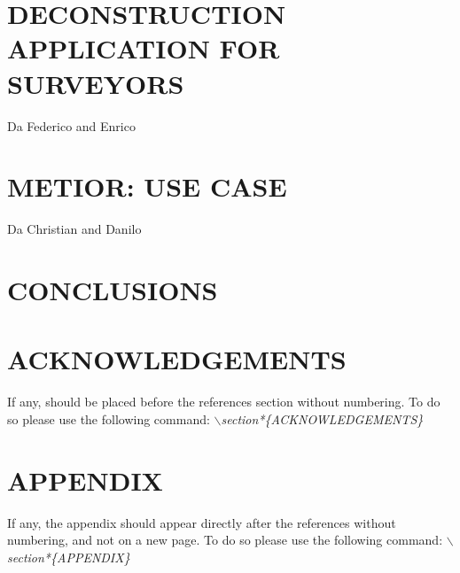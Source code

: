 \documentclass[a4paper,twoside]{article}
\begin{document}
\noindent\lipsum[2-4]


\section{\uppercase{Deconstruction Application for surveyors}}
\label{sec:introduction}

\noindent Da Federico and Enrico

\noindent\lipsum[2-4]


\section{\uppercase{Metior: use case}}
\label{sec:introduction}


\noindent Da Christian and Danilo

\noindent\lipsum[2-4]


\section{\uppercase{Conclusions}}
\label{sec:conclusion}

\noindent\lipsum[2-4]

\section*{\uppercase{Acknowledgements}}

\noindent If any, should be placed before the references section
without numbering. To do so please use the following command:
\textit{$\backslash$section*\{ACKNOWLEDGEMENTS\}}


\vfill

{\small
}


\section*{\uppercase{Appendix}}

\noindent If any, the appendix should appear directly after the
references without numbering, and not on a new page. To do so please use the following command:
\textit{$\backslash$section*\{APPENDIX\}}

\vfill
\end{document}
